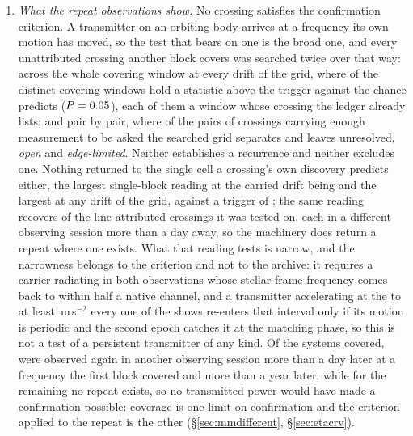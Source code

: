 \begin{enumerate}[leftmargin=1.6em,itemsep=4pt,topsep=4pt,parsep=0pt]
\item \emph{What the repeat observations show.} No crossing satisfies the
confirmation criterion. A transmitter on an orbiting body arrives at a
frequency its own motion has moved, so the test that bears on one is the broad
one, and every unattributed crossing another block covers was searched twice
over that way: across the whole covering window at every drift of the grid,
where \WuNWinExc{} of the \WuNWin{} distinct covering windows hold a statistic
above the trigger against the \WuExpWin{} chance predicts ($P=0.05$),
each of them a window whose crossing the ledger already lists; and pair by
pair, where of the \TjNPair{} pairs of crossings carrying enough measurement to
be asked the searched grid separates \TjNExcl{} and leaves \TjNOpen{}
unresolved, \TjNOpenPlain{} \emph{open} and \TjNPairEdge{}
\emph{edge-limited}. Neither establishes a recurrence and neither excludes one.
Nothing returned to the single cell a crossing's own discovery predicts either,
the largest single-block reading at the carried drift being \RcTMatched{} and
\RcTMax{} the largest at any drift of the grid, against a trigger of
\StageNullTrig; the same reading recovers \MkAttrRecur{} of the \MkAttrTested{}
line-attributed crossings it was tested on, each in a different observing
session more than a day away, so the machinery does return a repeat where one
exists. What that reading tests is narrow, and the narrowness belongs to the
criterion and not to the archive: it requires a carrier radiating in both
observations whose stellar-frame frequency comes back to within half a native
channel, and a transmitter accelerating at the \ZtALosLo{} to at least
\ZtALosHi\,m\,s$^{-2}$ every one of the \RcNExcl{} shows re-enters that
interval only if its motion is periodic and the second epoch catches it at the
matching phase, so this is not a test of a persistent transmitter of any kind.
Of the \NSysClassA{} systems covered, \ZcConfSysDay{} were observed again in
another observing session more than a day later at a frequency the first block
covered and \ZcConfSysYr{} more than a year later, while for the remaining
\ZcNoRepSys{} no repeat exists, so no transmitted power would have made a
confirmation possible: coverage is one limit on confirmation and the criterion
applied to the repeat is the other (\S\ref{sec:mmdifferent},
\S\ref{sec:etacrv}).


\end{enumerate}
